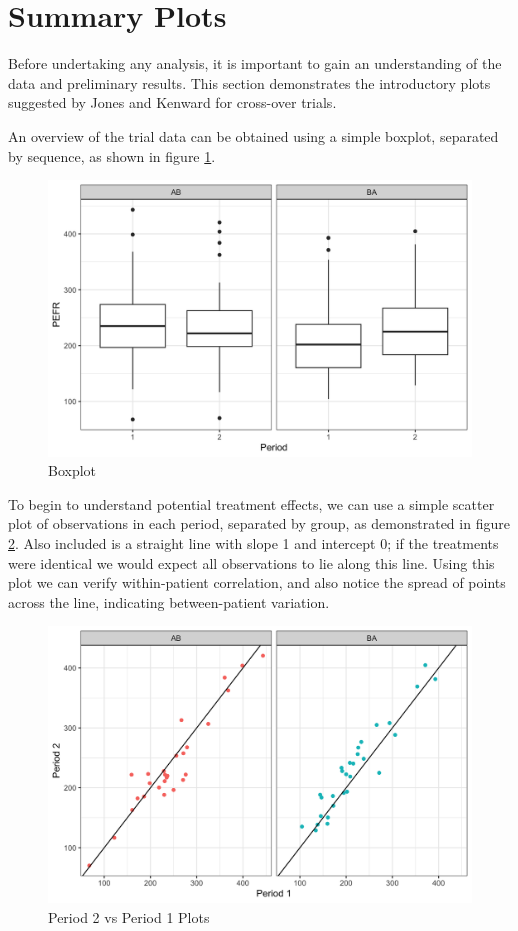 \documentclass[12pt, TexShade, letterpaper]{report}
\begin{document}
\section{Summary Plots}
Before undertaking any analysis, it is important to gain an understanding of the data and preliminary results. This section demonstrates the introductory plots suggested by Jones and Kenward \cite{jones2003design} for cross-over trials.

An overview of the trial data can be obtained using a simple boxplot, separated by sequence, as shown in figure \ref{fig:boxplot}.

\begin{figure}[ht]
    \centering
    \includegraphics[width=0.85\linewidth]{report/figures/boxplot.png}
    \caption{Boxplot}
    \label{fig:boxplot}
\end{figure}

To begin to understand potential treatment effects, we can use a simple scatter plot of observations in each period, separated by group, as demonstrated in figure \ref{fig:period2vsperiod1}. Also included is a straight line with slope 1 and intercept 0; if the treatments were identical we would expect all observations to lie along this line. Using this plot we can verify within-patient correlation, and also notice the spread of points across the line, indicating between-patient variation.

\begin{figure}[ht]
    \centering
    \includegraphics[width=0.85\linewidth]{report/figures/periodsPlot.png}
    \caption{Period 2 vs Period 1 Plots}
    \label{fig:period2vsperiod1}
\end{figure}
\end{document}
